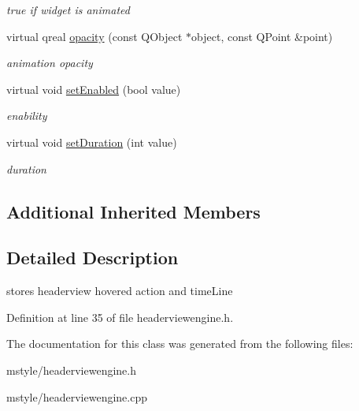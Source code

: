 \begin{DoxyCompactItemize}
\begin{DoxyCompactList}\small\item\em true if widget is animated \end{DoxyCompactList}\item 
\mbox{\label{class_header_view_engine_af5f474ce87512fe98f5128b3f071d70a}} 
virtual qreal \hyperlink{class_header_view_engine_af5f474ce87512fe98f5128b3f071d70a}{opacity} (const Q\+Object $\ast$object, const Q\+Point \&point)
\begin{DoxyCompactList}\small\item\em animation opacity \end{DoxyCompactList}\item 
\mbox{\label{class_header_view_engine_a091ba217836697a45df31db9da2d5217}} 
virtual void \hyperlink{class_header_view_engine_a091ba217836697a45df31db9da2d5217}{set\+Enabled} (bool value)
\begin{DoxyCompactList}\small\item\em enability \end{DoxyCompactList}\item 
\mbox{\label{class_header_view_engine_abac0120b4700c804bf85ff6cc99f4421}} 
virtual void \hyperlink{class_header_view_engine_abac0120b4700c804bf85ff6cc99f4421}{set\+Duration} (int value)
\begin{DoxyCompactList}\small\item\em duration \end{DoxyCompactList}\end{DoxyCompactItemize}
\subsection*{Additional Inherited Members}


\subsection{Detailed Description}
stores headerview hovered action and time\+Line 

Definition at line 35 of file headerviewengine.\+h.



The documentation for this class was generated from the following files\+:\begin{DoxyCompactItemize}
\item 
mstyle/headerviewengine.\+h\item 
mstyle/headerviewengine.\+cpp\end{DoxyCompactItemize}
